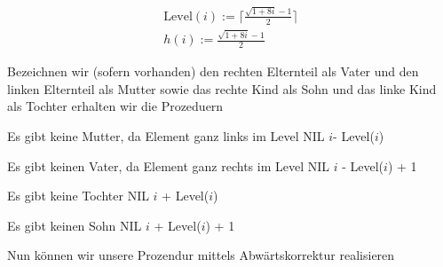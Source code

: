 \begin{solution}
\begin{enumerate}[label = \alph*)]
  \begin{align*}
    \mathrm{Level}(i) := \Big\lceil \frac{\sqrt{1 + 8i} - 1}{2}\Big\rceil \\
    h(i) := \frac{\sqrt{1 + 8i} - 1}{2}
  \end{align*}

  Bezeichnen wir (sofern vorhanden) den rechten Elternteil als Vater und den linken Elternteil als Mutter sowie das rechte Kind als Sohn und das linke Kind als Tochter erhalten wir die Prozeduern



    \begin{algorithmic}[1]
            \Comment Es gibt keine Mutter, da Element ganz links im Level
                \State \Return NIL
            \Else
                \State \Return $i$- Level($i$)
            \EndIf
        \EndProcedure
    \end{algorithmic}

\phantom{}

    \begin{algorithmic}[1]
            \Comment Es gibt keinen Vater, da Element ganz rechts im Level
                \State \Return NIL
            \Else
                \State \Return $i$ - Level($i$) + 1
            \EndIf
        \EndProcedure
    \end{algorithmic}

\phantom{}

    \begin{algorithmic}[1]
            \Comment Es gibt keine Tochter
                \State \Return NIL
            \Else
                \State \Return $i$ + Level($i$)
            \EndIf
        \EndProcedure
    \end{algorithmic}

\phantom{}

    \begin{algorithmic}[1]
            \Comment Es gibt keinen Sohn
                \State \Return NIL
            \Else
                \State \Return $i$ + Level($i$) + 1
            \EndIf
        \EndProcedure
    \end{algorithmic}


Nun können wir unsere Prozendur mittels Abwärtskorrektur realisieren


\end{enumerate}
\end{solution}
